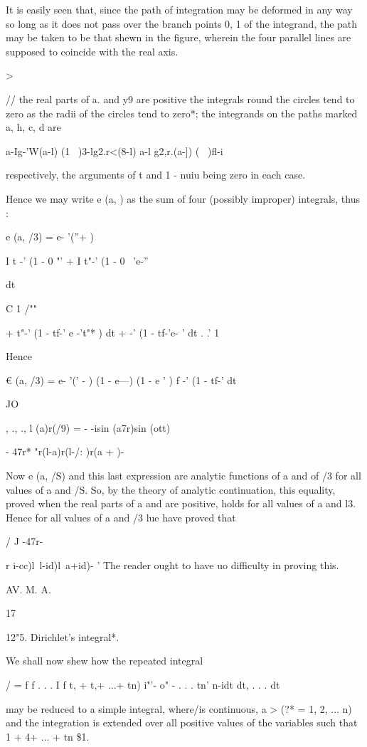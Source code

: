 It is easily seen that, since the path of integration may be deformed
in any way so long as it does not pass over the branch points 0, 1 of
the integrand, the path may be taken to be that shewn in the figure,
wherein the four parallel lines are supposed to coincide with the real
axis.

>

// the real parts of a. and y9 are positive the integrals round the
circles tend to zero as the radii of the circles tend to zero*; the
integrands on the paths marked a, h, c, d are

 a-Ig-'W(a-l) (1 \ )3-lg2.r<(8-l) a-l g2,r.(a-]) ( \ )fl-i

respectively, the arguments of t and 1 - nuiu being zero in each case.

Hence we may write e (a, ) as the sum of four (possibly improper)
integrals, thus :

e (a, /3) = e- '(''+ )

I t -' (1 - 0 "' + I t"-' (1 - 0 ~'e-''

 dt

C 1 /""

+ t"-' (1 - tf-' e -'t"* ) dt + -' (1 - tf-'e- ' dt . .' 1

Hence

€ (a, /3) = e- '(' - ) (1 - e---) (1 - e ' ) f -' (1 - tf-' dt

JO

, ., ., l (a)r(/9) = - -isin (a7r)sin (ott) ~

- 47r* "r(l-a)r(l-/: )r(a + )-

Now e (a, /S) and this last expression are analytic functions of a and
of /3 for all values of a and /S. So, by the theory of analytic
continuation, this equality, proved when the real parts of a and are
positive, holds for all values of a and l3. Hence for all values of a
and /3 lue have proved that

/ J -47r-

r i-cc)l\ l-id)l\ a+id)- ' The reader ought to have uo difficulty in
proving this.

AV. M. A.

17

%
%

12"5. Dirichlet's integral*.

We shall now shew how the repeated integral

/ = f f . . . I f t, + t,+ ...+ tn) i"'- o" - . . . tn' n-idt dt, . .
. dt

may be reduced to a simple integral, where/is continuous, a > (?* = 1,
2, ... n) and the integration is extended over all positive values of
the variables such that 1 + 4+ ... + tn \$1.

